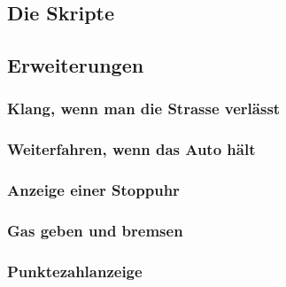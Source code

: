 \documentclass[12pt,a4paper,titlepage]{article}
\begin{document}
\subsection{Die Skripte}
\label{sub:skripte}

\subsection{Erweiterungen}

\subsubsection{Klang, wenn man die Strasse verlässt}

\subsubsection{Weiterfahren, wenn das Auto hält}

\subsubsection{Anzeige einer Stoppuhr}

\subsubsection{Gas geben und bremsen}

\subsubsection{Punktezahlanzeige}
\end{document}
